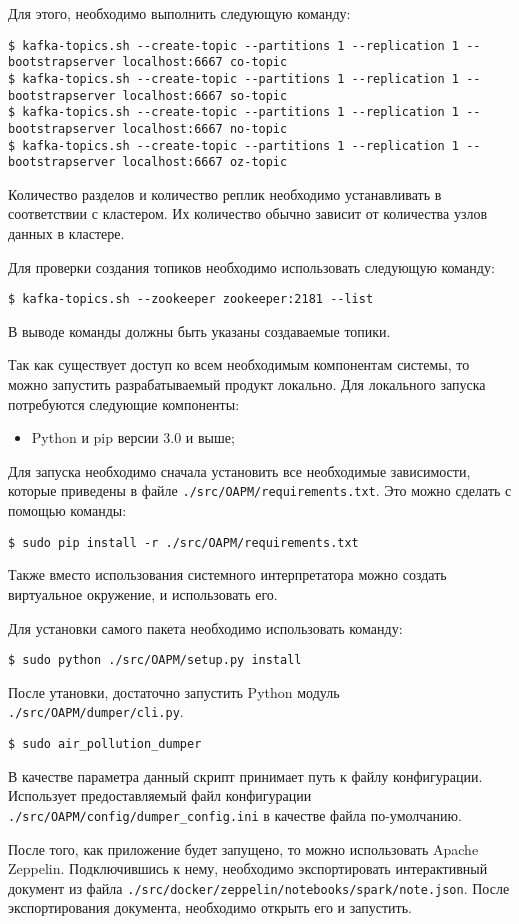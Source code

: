 Для этого, необходимо выполнить следующую команду:
\begin{lstlisting}    
$ kafka-topics.sh --create-topic --partitions 1 --replication 1 --bootstrapserver localhost:6667 co-topic
$ kafka-topics.sh --create-topic --partitions 1 --replication 1 --bootstrapserver localhost:6667 so-topic
$ kafka-topics.sh --create-topic --partitions 1 --replication 1 --bootstrapserver localhost:6667 no-topic
$ kafka-topics.sh --create-topic --partitions 1 --replication 1 --bootstrapserver localhost:6667 oz-topic
\end{lstlisting}

Количество разделов и количество реплик необходимо устанавливать в соответствии с кластером.
Их количество обычно зависит от количества узлов данных в кластере.

Для проверки создания топиков необходимо использовать следующую команду:
\begin{lstlisting}
$ kafka-topics.sh --zookeeper zookeeper:2181 --list
\end{lstlisting}
В выводе команды должны быть указаны создаваемые топики.

Так как существует доступ ко всем необходимым компонентам системы, то можно запустить разрабатываемый продукт локально.
Для локального запуска потребуются следующие компоненты:

\begin{itemize}
    \item Python и pip версии 3.0 и выше;
\end{itemize}

Для запуска необходимо сначала установить все необходимые зависимости, которые приведены в файле \texttt{./src/OAPM/requirements.txt}.
Это можно сделать с помощью команды:
\begin{lstlisting}
$ sudo pip install -r ./src/OAPM/requirements.txt
\end{lstlisting}
Также вместо использования системного интерпретатора можно создать виртуальное окружение, и использовать его.

Для установки самого пакета необходимо использовать команду:
\begin{lstlisting}
$ sudo python ./src/OAPM/setup.py install
\end{lstlisting}

После утановки, достаточно запустить Python модуль \texttt{./src/OAPM/dumper/cli.py}.
\begin{lstlisting}
$ sudo air_pollution_dumper
\end{lstlisting}

В качестве параметра данный скрипт принимает путь к файлу конфигурации.
Использует предоставляемый файл конфигурации \texttt{./src/OAPM/config/dumper\_config.ini} в качестве файла по-умолчанию.

После того, как приложение будет запущено, то можно использовать Apache Zeppelin.
Подключившись к нему, необходимо экспортировать интерактивный документ из файла \texttt{./src/docker/zeppelin/notebooks/spark/note.json}.
После экспортирования документа, необходимо открыть его и запустить.

